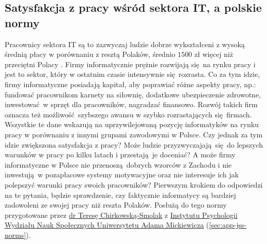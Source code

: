 \subsection{Satysfakcja z pracy wśród sektora IT, a polskie normy}
\label{sec:hip-sat-norms}
Pracownicy sektora IT są to zazwyczaj ludzie dobrze wykształceni z wysoką średnią płacy w porównaniu z resztą Polaków, średnio $1500$ zł więcej niż przeciętni Polacy \citep{web:earnings-it,web:earnings-pl}. Firmy informatycznie prężnie rozwijają się na rynku pracy i jest to sektor, który w ostatnim czasie intensywnie się rozrasta. Co za tym idzie, firmy informatyczne posiadają kapitał, aby poprawiać różne aspekty pracy, np.: fundować pracownikom karnety na siłownię, dodatkowe ubezpieczenie zdrowotne, inwestować w sprzęt dla pracowników, nagradzać
finansowo. Rozwój takich firm oznacza też możliwość szybszego awansu w szybko rozrastających się firmach. Wszystkie te dane wskazują na uprzywilejowaną pozycję informatyków na rynku pracy w porównaniu z innymi grupami zawodowymi w Polsce. Czy jednak za tym idzie zwiększona satysfakcja z pracy? Może ludzie przyzwyczajają się do lepszych warunków w pracy po kilku latach i przestają je doceniać? A może firmy informatyczne w Polsce nie
przenoszą dobrych wzorców z Zachodu i nie inwestują w pozapłacowe systemy motywacyjne oraz nie interesuje ich jak polepszyć warunki pracy swoich pracowników? Pierwszym krokiem do odpowiedzi na te pytania, będzie sprawdzenie, czy faktycznie informatycy są bardziej zadowoleni ze swojej pracy niż reszta Polaków. Posłużą do tego normy przygotowane przez
\href{http://www.psychologia.amu.edu.pl/ip-uam/struktura-zatrudnienia-w-instytucie/curriculum-vitae-teresa-chirkowska-smolak/}{dr Teresę Chirkowską-Smolak} z \href{http://www.psychologia.amu.edu.pl/}{Instytutu Psychologii Wydziału Nauk Społecznych Uniwersytetu Adama Mickiewicza} (\ref{sec:app-jss-norms}).

